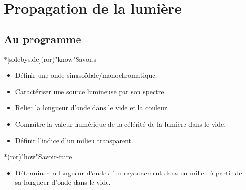 \documentclass[../../main/main.tex]{subfiles}
\begin{document}
\chapter{Propagation de la lumi\`ere}

\section*{Au programme}


\begin{tcb}*[sidebyside](ror)"know"{Savoirs}
	\begin{itemize}[label=$\diamond$, leftmargin=10pt]
		\item Définir une onde sinusoïdale/monochromatique.
		\item Caractériser une source lumineuse par son spectre.
		\item Relier la longueur d'onde dans le vide et la couleur.
	\end{itemize}
	\tcblower
	\begin{itemize}[label=$\diamond$, leftmargin=10pt]
		\item Connaître la valeur numérique de la célérité de la lumière dans le
		      vide.
		\item Définir l'indice d'un milieu transparent.
	\end{itemize}
\end{tcb}

\begin{tcb}*(ror)"how"{Savoir-faire}
	\begin{itemize}[label=$\diamond$, leftmargin=10pt]
		\item Déterminer la longueur d'onde d'un rayonnement dans un milieu à partir
		      de sa longueur d'onde dans le vide.
	\end{itemize}
\end{tcb}
\end{document}

